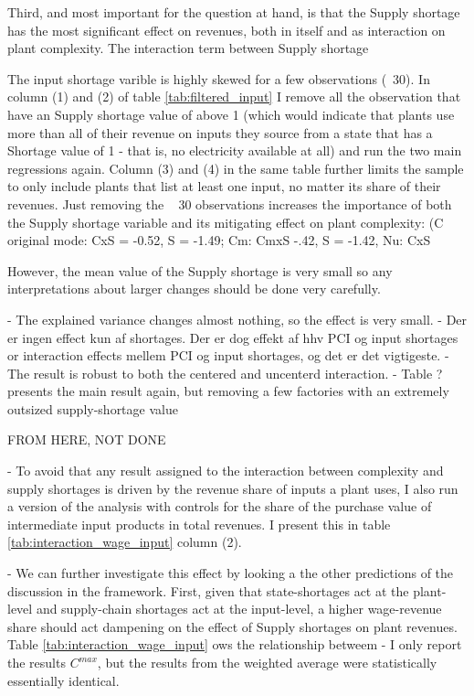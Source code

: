\documentclass[11pt]{article}
\begin{document}
Third, and most important for the question at hand, is that the Supply shortage has the most significant effect on revenues, both in itself and as interaction on plant complexity. The interaction term between Supply shortage 


The input shortage varible is highly skewed for a few observations (~30). In column (1) and (2) of table \ref{tab:filtered_input} I remove all the observation that have an Supply shortage value of above 1 (which would indicate that plants use more than all of their revenue on inputs they source from a state that has a Shortage value of 1 - that is, no electricity available at all) and run the two main regressions again. Column (3) and (4) in the same table further limits the sample to only include plants that list at least one input, no matter its share of their revenues. Just removing the ~ 30 observations increases the importance of both the Supply shortage variable and its mitigating effect on plant complexity: (C original mode: CxS = -0.52, S = -1.49; Cm: CmxS -.42, S = -1.42, Nu: CxS

However, the mean value of the Supply shortage is very small so any interpretations about larger changes should be done very carefully.

- The explained variance changes almost nothing, so the effect is very small. 
- Der er ingen effect kun af shortages. Der er dog effekt af hhv PCI og input shortages or interaction effects mellem PCI og input shortages, og det er det vigtigeste.
- The result is robust to both the centered and uncenterd interaction.
- Table ? presents the main result again, but removing a few factories with an extremely outsized supply-shortage value


FROM HERE, NOT DONE

- To avoid that any result assigned to the interaction between complexity and supply shortages is driven by the revenue share of inputs a plant uses, I also run a version of the analysis with controls for the share of the purchase value of intermediate input products in total revenues. I present this in table \ref{tab:interaction_wage_input} column (2).

 - We can further investigate this effect by looking a the other predictions of the discussion in the framework. First, given that state-shortages act at the plant-level and supply-chain shortages act at the input-level, a higher wage-revenue share should act dampening on the effect of Supply shortages on plant revenues. Table \ref{tab:interaction_wage_input} ows the relationship betweem 
- I only report the results $C^{max}$, but the results from the weighted average were statistically essentially identical.
\end{document}
